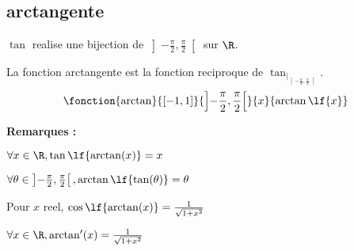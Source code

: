 \documentclass[12pt,twoside,a4paper]{article}
\begin{document}
		\subsection{arctangente}
			$\tan$ realise une bijection de $\left]-\frac{\pi}{2},\frac{\pi}{2}\right[$ sur $\R$.
			\begin{defi}
				La fonction arctangente est la fonction reciproque de $\tan_{|_{\left]-\frac{\pi}{2},\frac{\pi}{2}\right[}}$.
				$$\fonction{\arctan}{[-1,1]}{\left]-\frac{\pi}{2},\frac{\pi}{2}\right[}{x}{\arctan\lf{x}}$$
			\end{defi}
			\textbf{Remarques :}
			\begin{liste}
				\item $\forall x\in\R,\tan\lf{\arctan(x)}=x$
				\item $\forall\theta\in\left]-\frac{\pi}{2},\frac{\pi}{2}\right[,\arctan\lf{\tan(\theta)}=\theta$
				\item Pour $x$ reel, $\cos\lf{\arctan(x)}=\frac{1}{\sqrt{1+x^2}}$
				\item $\forall x\in\R,\arctan'(x)=\frac{1}{\sqrt{1+x^2}}$
			\end{liste}
\end{document}
